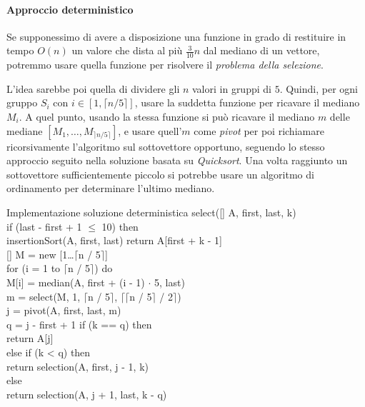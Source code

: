 
\paragraph{Approccio deterministico}
Se supponessimo di avere a disposizione una funzione in grado di restituire in
tempo $O(n)$ un valore che dista al più $\frac{3}{10}n$ dal mediano di un vettore,
potremmo usare quella funzione per risolvere il \emph{problema della selezione}.

L'idea sarebbe poi quella di dividere gli $n$ valori in gruppi di $5$. Quindi,
per ogni gruppo $S_i$ con $i\in[1,\lceil n/5\rceil]$, usare la suddetta funzione
per ricavare il mediano $M_i$. A quel punto, usando la stessa funzione si può
ricavare il mediano $m$ delle mediane $[M_1,\dots,M_{\rceil n/5\rceil}]$, e usare
quell'$m$ come \emph{pivot} per poi richiamare ricorsivamente l'algoritmo
sul sottovettore opportuno, seguendo lo stesso approccio seguito nella soluzione
basata su \emph{Quicksort}. Una volta raggiunto un sottovettore sufficientemente
piccolo si potrebbe usare un algoritmo di ordinamento per determinare l'ultimo
mediano.

\newpage
\begin{minicode}{Implementazione soluzione deterministica}
\ind{} select([] A,  first,  last,  k)\\
    \indf if (last - first + 1 $\leq$ 10) then\\
        insertionSort(A, first, last)\hfill{}
        return A[first + k - 1]\\
    \indf{}
    \indf{}[] M = new [1\dots$\lceil$n / 5$\rceil$]\\
    \indf for (i = 1 to $\lceil$n / 5$\rceil$) do\\
        M[i] = median(A, first + (i - 1) $\cdot$ 5, last)\\
    \indf{}
    \indf{} m = select(M, 1, $\lceil$n / 5$\rceil$, $\lceil\lceil$n / 5$\rceil$ / 2$\rceil$)\\
    \indf{} j = pivot(A, first, last, m)\\
    \indf{} q = j - first + 1\hfill{}
    \indf if (k == q) then\\
        return A[j]\\
    \indf else if (k < q) then\\
        return selection(A, first, j - 1, k)\\
    \indf else\\
        return selection(A, j + 1, last, k - q)
\end{minicode}

